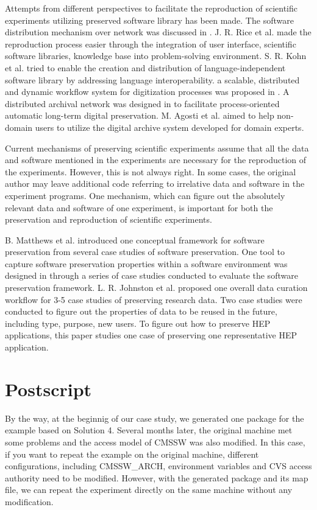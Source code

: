 \documentclass{sig-alternate}
\begin{document}
Attempts from different perspectives to facilitate the reproduction of scientific experiments utilizing preserved software library has been made. 
The software distribution mechanism over network was discussed in \cite{compostella2010cdf, blomer2011cernvm}.
J. R. Rice et al. \cite{rice1996scientific} made the reproduction process easier through the integration of user interface, scientific software libraries, knowledge base into problem-solving environment.
S. R. Kohn et al. \cite{kohn2001divorcing} tried to enable the creation and distribution of language-independent software library by addressing language interoperability.
a scalable, distributed and dynamic workflow system for digitization processes was proposed in \cite{schoneberg2013scalable}.
A distributed archival network was designed in \cite{subotic2013distributed} to facilitate process-oriented automatic long-term digital preservation.
M. Agosti et al. \cite{agosti2012envisage} aimed to help non-domain users to utilize the digital archive system developed for domain experts.

Current mechanisms of preserving scientific experiments assume that all the data and software mentioned in the experiments are necessary for the reproduction of the experiments. However, this is not always right. In some cases, the original author may leave additional code referring to irrelative data and software in the experiment programs. One mechanism, which can figure out the absolutely relevant data and software of one experiment, is important for both the preservation and reproduction of scientific experiments.

B. Matthews et al. \cite{matthews2008significant} introduced one conceptual framework for software preservation from several case studies of software preservation.
One tool to capture software preservation properties within a software environment was designed in \cite{matthews2010framework} through a series of case studies conducted to evaluate the software preservation framework.
L. R. Johnston et al. \cite{johnston2014workflow} proposed one overall data curation workflow for 3-5 case studies of preserving research data.
Two case studies \cite{borgman2012data} were conducted to figure out the properties of data to be reused in the future, including type, purpose, new users.
To figure out how to preserve HEP applications, this paper studies one case of preserving one representative HEP application.

\section{Postscript}
By the way, at the beginnig of our case study, we generated one package for the
example based on Solution 4. Several months later, the original machine met
some problems and the access model of CMSSW was also modified. In this case, if
you want to repeat the example on the original machine, different 
configurations, including CMSSW\_ARCH, environment variables and CVS access
authority need to be modified. However, with the generated package and its map file, we can repeat the experiment directly on the same machine without any modification.



\end{document}
